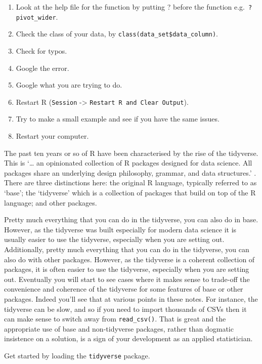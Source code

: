 \documentclass[
]{book}
\providecommand{\tightlist}{%
  \setlength{\itemsep}{0pt}\setlength{\parskip}{0pt}}
\begin{document}
\begin{enumerate}
\def\labelenumi{\arabic{enumi}.}
\tightlist
\item
  Look at the help file for the function by putting ? before the function e.g.~\texttt{?pivot\_wider}.
\item
  Check the class of your data, by \texttt{class(data\_set\$data\_column)}.
\item
  Check for typos.
\item
  Google the error.
\item
  Google what you are trying to do.
\item
  Restart R (\texttt{Session} -\textgreater{} \texttt{Restart\ R\ and\ Clear\ Output}).
\item
  Try to make a small example and see if you have the same issues.
\item
  Restart your computer.
\end{enumerate}

The past ten years or so of R have been characterised by the rise of the tidyverse. This is `\ldots{} an opinionated collection of R packages designed for data science. All packages share an underlying design philosophy, grammar, and data structures.' \citet{tidyversewebsite}. There are three distinctions here: the original R language, typically referred to as `base'; the `tidyverse' which is a collection of packages that build on top of the R language; and other packages.

Pretty much everything that you can do in the tidyverse, you can also do in base. However, as the tidyverse was built especially for modern data science it is usually easier to use the tidyverse, especially when you are setting out. Additionally, pretty much everything that you can do in the tidyverse, you can also do with other packages. However, as the tidyverse is a coherent collection of packages, it is often easier to use the tidyverse, especially when you are setting out. Eventually you will start to see cases where it makes sense to trade-off the convenience and coherence of the tidyverse for some features of base or other packages. Indeed you'll see that at various points in these notes. For instance, the tidyverse can be slow, and so if you need to import thousands of CSVs then it can make sense to switch away from \texttt{read\_csv()}. That is great and the appropriate use of base and non-tidyverse packages, rather than dogmatic insistence on a solution, is a sign of your development as an applied statistician.

Get started by loading the \texttt{tidyverse} package.
\end{document}
